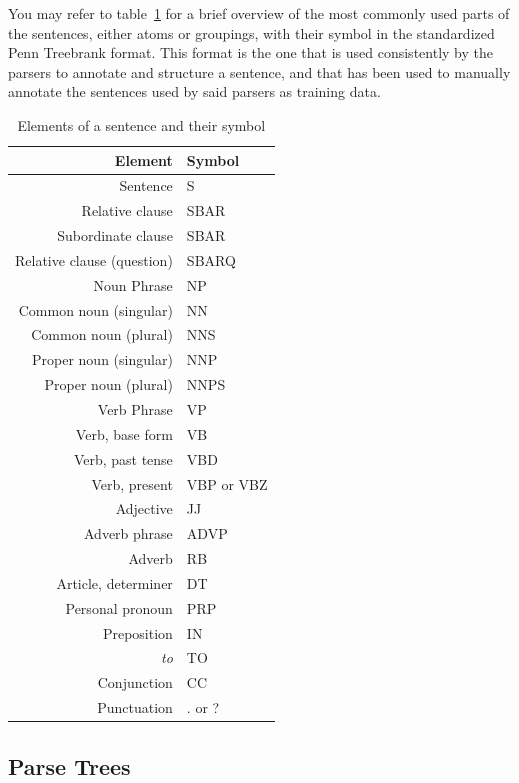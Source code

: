 You may refer to table~\ref{tab:penntree_symbols} for a brief overview of the most commonly used parts of the sentences, either atoms or groupings, with their symbol in the standardized Penn Treebrank format. This format is the one that is used consistently by the parsers to annotate and structure a sentence, and that has been used to manually annotate the sentences used by said parsers as training data.

\begin{table}[ht]
  \caption{Elements of a sentence and their symbol}
  \label{tab:penntree_symbols}
  \begin{center}
  \begin{tabular}{r l}
  Element & Symbol\\
  \hline
  Sentence & S\\
  Relative clause & SBAR\\
  Subordinate clause & SBAR\\
  Relative clause (question) & SBARQ\\
  Noun Phrase & NP\\
  Common noun (singular) & NN\\
  Common noun (plural) & NNS\\
  Proper noun (singular) & NNP\\
  Proper noun (plural) & NNPS\\
  Verb Phrase & VP\\
  Verb, base form & VB\\
  Verb, past tense & VBD\\
  Verb, present & VBP or VBZ\\
  Adjective & JJ\\
  Adverb phrase & ADVP\\
  Adverb & RB\\
  Article, determiner & DT\\
  Personal pronoun & PRP\\
  Preposition & IN\\
  \emph{to} & TO\\
  Conjunction & CC\\
  Punctuation & . or ?\\
  \end{tabular}
  \end{center}
\end{table}


\subsection{Parse Trees} %
\label{sub:parse_trees}

